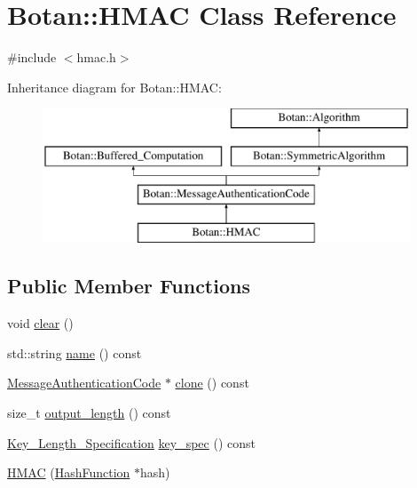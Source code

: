 \hypertarget{classBotan_1_1HMAC}{\section{Botan\-:\-:H\-M\-A\-C Class Reference}
\label{classBotan_1_1HMAC}
}


{\ttfamily \#include $<$hmac.\-h$>$}

Inheritance diagram for Botan\-:\-:H\-M\-A\-C\-:\begin{figure}[H]
\begin{center}
\leavevmode
\includegraphics[height=4.000000cm]{classBotan_1_1HMAC}
\end{center}
\end{figure}
\subsection*{Public Member Functions}
\begin{DoxyCompactItemize}
\item 
void \hyperlink{classBotan_1_1HMAC_ad55452473489d3eb3fb080255b2e9757}{clear} ()
\item 
std\-::string \hyperlink{classBotan_1_1HMAC_a91084b8a46c47a7f589008039a48669e}{name} () const 
\item 
\hyperlink{classBotan_1_1MessageAuthenticationCode}{Message\-Authentication\-Code} $\ast$ \hyperlink{classBotan_1_1HMAC_a51b4925f8c7da7545759c3d1c9dd15ce}{clone} () const 
\item 
size\-\_\-t \hyperlink{classBotan_1_1HMAC_a26ea85e317ae55a4e94a4ef6ee584d13}{output\-\_\-length} () const 
\item 
\hyperlink{classBotan_1_1Key__Length__Specification}{Key\-\_\-\-Length\-\_\-\-Specification} \hyperlink{classBotan_1_1HMAC_a84ae47085bc5be75485e14f8dbb4459a}{key\-\_\-spec} () const 
\item 
\hyperlink{classBotan_1_1HMAC_ada142ebfbfe175055010e47e53ac15d1}{H\-M\-A\-C} (\hyperlink{classBotan_1_1HashFunction}{Hash\-Function} $\ast$hash)
\end{DoxyCompactItemize}


